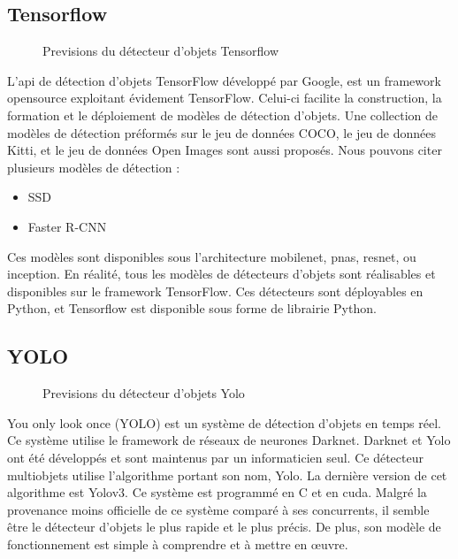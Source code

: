 \documentclass[debug,nodate,hideweeklyreports,noposter]{polytech/polytech}
\begin{document}
\subsection{Tensorflow}

\begin{figure}
  \caption{Previsions du détecteur d'objets Tensorflow}
  \label{fig:imgtensor}
\end{figure}
 
L'\gls{api} de détection d'objets TensorFlow développé par Google, est un \gls{framework} \gls{opensource} exploitant évidement TensorFlow. Celui-ci facilite la construction, la formation et le déploiement de modèles de détection d'objets. Une collection de modèles de détection préformés sur le jeu de données COCO, le jeu de données Kitti, et le jeu de données Open Images sont aussi proposés. Nous pouvons citer plusieurs modèles de détection : 
\begin{itemize}
\item SSD 
\item Faster R-CNN
\end{itemize}
Ces modèles sont disponibles sous l’architecture mobilenet, pnas, resnet, ou inception.
En réalité, tous les modèles de détecteurs d’objets sont réalisables et disponibles sur le \gls{framework} TensorFlow. Ces détecteurs sont déployables en Python, et Tensorflow est disponible sous forme de librairie Python.

\subsection{YOLO}

\begin{figure}
  \caption{Previsions du détecteur d'objets Yolo}
  \label{fig:imgyolo}
\end{figure}
 
You only look once (YOLO) est un système de détection d’objets en temps réel. Ce système utilise le \gls{framework} de réseaux de neurones Darknet. Darknet et Yolo ont été développés et sont maintenus par un informaticien seul. Ce détecteur multiobjets utilise l’algorithme portant son nom, Yolo. La dernière version de cet algorithme est Yolov3.
Ce système est programmé en C et en \gls{cuda}.
Malgré la provenance moins officielle de ce système comparé à ses concurrents, il semble être le détecteur d’objets le plus rapide et le plus précis. De plus, son modèle de fonctionnement est simple à comprendre et à mettre en œuvre.
\end{document}
